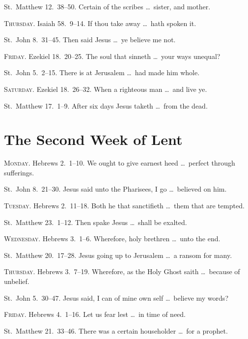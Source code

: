  St.~Matthew 12.~38–50.   Certain of the scribes \ldots\ sister, and mother.

{\scshape Thursday.}  Isaiah 58.~9–14.   If thou take away \ldots\ hath spoken it.

 St.~John 8.~31–45.   Then said Jesus \ldots\ ye believe me not.

{\scshape Friday.}  Ezekiel 18.~20–25.   The soul that sinneth \ldots\ your ways unequal?

 St.~John 5.~2–15.   There is at Jerusalem \ldots\ had made him whole.

{\scshape Saturday.}  Ezekiel 18.~26–32.   When a righteous man \ldots\ and live ye.

 St.~Matthew 17.~1–9.   After six days Jesus taketh \ldots\ from the dead.

\section{The Second Week of Lent}

{\scshape Monday.}  Hebrews 2.~1–10.   We ought to give earnest heed \ldots\ perfect through sufferings.

 St.~John 8.~21–30.   Jesus said unto the Pharisees, I go \ldots\ believed on him.

{\scshape Tuesday.}  Hebrews 2.~11–18.   Both he that sanctifieth \ldots\ them that are tempted.

 St.~Matthew 23.~1–12.   Then spake Jesus \ldots\ shall be exalted.

{\scshape Wednesday.}  Hebrews 3.~1–6.   Wherefore, holy brethren \ldots\ unto the end.

 St.~Matthew 20.~17–28.   Jesus going up to Jerusalem \ldots\ a ransom for many.
    
{\scshape Thursday.}  Hebrews 3.~7–19.   Wherefore, as the Holy Ghost saith \ldots\ because of unbelief.

 St.~John 5.~30–47.   Jesus said, I can of mine own self \ldots\ believe my words?

{\scshape Friday.}  Hebrews 4.~1–16.   Let us fear lest \ldots\ in time of need.

 St.~Matthew 21.~33–46.   There was a certain householder \ldots\ for a prophet.

